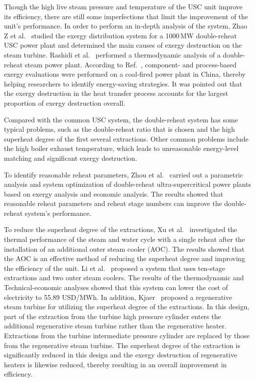 \documentclass[preprint,12pt]{elsarticle}
\begin{document}
Though the high live steam pressure and temperature of the USC unit improve its efficiency, there are still some imperfections that limit the improvement of the unit's performance. 
In order to perform an in-depth analysis of the system, Zhao Z et al.~\cite{Zhao2017Exergy} studied the exergy distribution system for a 1000\,MW double-reheat USC power plant and determined the main causes of exergy destruction on the steam turbine.
Rashidi et al.~\cite{Rashidi2014Thermodynamic} performed a thermodynamic analysis of a double-reheat steam power plant.
According to Ref.~\cite{Wu2014Component}, component- and process-based exergy evaluations were performed on a coal-fired power plant in China, thereby helping researchers to identify energy-saving strategies.
It was pointed out that the exergy destruction in the heat transfer process accounts for the largest proportion of exergy destruction overall.


Compared with the common USC system, the double-reheat system has some typical problems, such as the double-reheat ratio that is chosen and the high superheat degree of the first several extractions.
Other common problems include the high boiler exhaust temperature, which leads to unreasonable energy-level matching and significant exergy destruction. 

To identify reasonable reheat parameters, Zhou et al.~\cite{Zhou2016Parametric} carried out a parametric analysis and system optimization of double-reheat ultra-supercritical power plants based on exergy analysis and economic analysis. The results showed that reasonable reheat parameters and reheat stage numbers can improve the double-reheat system's performance.


To reduce the superheat degree of the extractions, Xu et al.~\cite{Xu2015Optimum} investigated the thermal performance of the steam and water cycle with a single reheat after the installation of an additional outer steam cooler (AOC).
The results showed that the AOC is an effective method of reducing the superheat degree and improving the efficiency of the unit.
Li et al.~\cite{Li2014Thermodynamic} proposed a system that uses ten-stage extractions and two outer steam coolers. 
The results of the thermodynamic and Technical-economic analyses showed that this system can lower the cost of electricity to 55.89 USD/MWh.
In addition, Kjaer~\cite{Kjaer2010A} proposed a regenerative steam turbine for utilizing the superheat degree of the extractions.
In this design, part of the extraction from the turbine high pressure cylinder enters the additional regenerative steam turbine rather than the regenerative heater.
Extractions from the turbine intermediate pressure cylinder are replaced by those from the regenerative steam turbine.
The superheat degree of the extraction is significantly reduced in this design and the exergy destruction of regenerative heaters is likewise reduced, thereby resulting in an overall improvement in efficiency.
\end{document}

